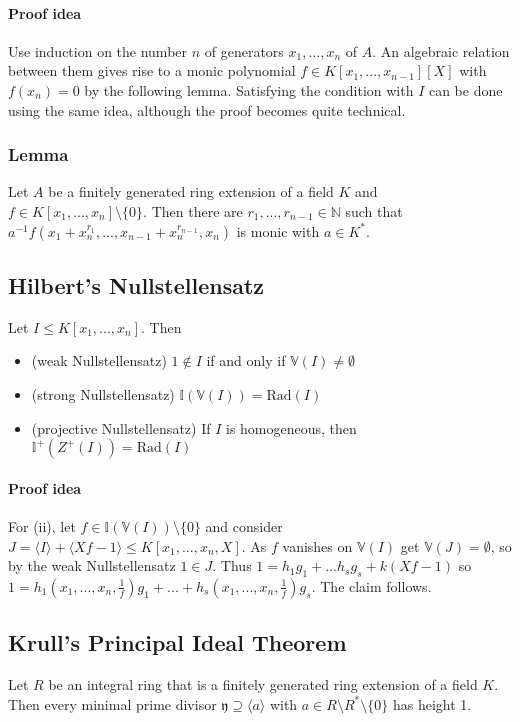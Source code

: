 \documentclass{scrartcl}
\newcommand{\N}{\mathbb{N}}
\newcommand{\I}{\mathbb{I}}
\newcommand{\V}{\mathbb{V}}
\begin{document}
\paragraph{Proof idea} Use induction on the number $n$ of generators $x_1, ..., x_n$ of $A$. 
An algebraic relation between them gives rise to a monic polynomial $f \in K[x_1, ..., x_{n - 1}][X]$ with $f(x_n) = 0$ by the following lemma.
Satisfying the condition with $I$ can be done using the same idea, although the proof becomes quite technical.

\subsubsection{Lemma}
Let $A$ be a finitely generated ring extension of a field $K$ and $f \in K[x_1, ..., x_n] \setminus \{0\}$.
Then there are $r_1, ..., r_{n - 1} \in \N$ such that $a^{-1}f(x_1 + x_n^{r_1}, ..., x_{n - 1} + x_n^{r_{n - 1}}, x_n)$ is monic with $a \in K^*$.

\subsection{Hilbert's Nullstellensatz}
Let $I \leq K[x_1, ..., x_n]$. Then
\begin{itemize}
    \item (weak Nullstellensatz) $1 \notin I$ if and only if $\V(I) \neq \emptyset$
    \item (strong Nullstellensatz) $\I(\V(I)) = \mathrm{Rad}(I)$
    \item (projective Nullstellensatz) If $I$ is homogeneous, then $\I^+(Z^+(I)) = \mathrm{Rad}(I)$
\end{itemize}
\paragraph{Proof idea} For (ii), let $f \in \I(\V(I)) \setminus \{0\}$ and consider $J = \langle I \rangle + \langle Xf - 1 \rangle \leq K[x_1, ..., x_n, X]$.
As $f$ vanishes on $\V(I)$ get $\V(J) = \emptyset$, so by the weak Nullstellensatz $1 \in J$.
Thus $1 = h_1 g_1 + ... h_s g_s + k(Xf - 1)$ so $1 = h_1(x_1, ..., x_n, \frac 1 f) g_1 + ... + h_s(x_1, ..., x_n, \frac 1 f) g_s$.
The claim follows.

\subsection{Krull's Principal Ideal Theorem}
\label{krulls_pit}
Let $R$ be an integral ring that is a finitely generated ring extension of a field $K$.
Then every minimal prime divisor $\mathfrak{y} \supseteq \langle a \rangle$ with $a \in R \setminus R^* \setminus \{ 0 \}$ has height 1.
\end{document}
